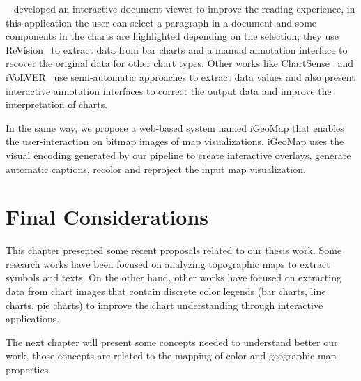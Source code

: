 \citeauthor{Kong2014}~\citep{Kong2014} developed an interactive document viewer to improve the reading experience, in this application the user can select a paragraph in a document and some components in the charts are highlighted depending on the selection; they use ReVision~\citep{Savva2011} to extract data from bar charts and a manual annotation interface to recover the original data for other chart types. Other works like ChartSense~\citep{Jung2017} and iVoLVER~\citep{Mendez2016} use semi-automatic approaches to extract data values and also present interactive annotation interfaces to correct the output data and improve the interpretation of charts.

In the same way, we propose a web-based system named iGeoMap that enables the user-interaction on bitmap images of map visualizations. iGeoMap uses the visual encoding generated by our pipeline to create interactive overlays, generate automatic captions, recolor and reproject the input map visualization.


\section{Final Considerations}
This chapter presented some recent proposals related to our thesis work. Some research works have been focused on analyzing topographic maps to extract symbols and texts. On the other hand, other works have focused on extracting data from chart images that contain discrete color legends (\eg bar charts, line charts, pie charts) to improve the chart understanding through interactive applications.

The next chapter will present some concepts needed to understand better our work, those concepts are related to the mapping of color and geographic map properties.
